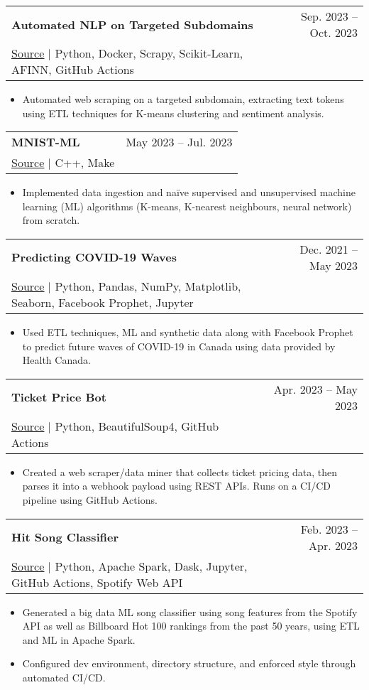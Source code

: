 \documentclass[letterpaper,11pt]{article}
\makeatletter
\newcommand{\resumeItem}[1]{
  \item\small{
    {#1 \vspace{-2pt}}
  }
}
\newcommand{\resumeProjectHeading}[4]{ %
    \item
    \begin{tabular*}{0.97\textwidth}{l@{\extracolsep{\fill}}r}
      \small\textbf{#1} & #2 \\
    \small\href{#3}{{\footnotesize\faGithub} \underline{Source}} $|$ #4 & \\ %
    \end{tabular*}\vspace{-7pt}
}
\newcommand{\resumeItemListStart}{\begin{itemize}}
\newcommand{\resumeItemListEnd}{\end{itemize}\vspace{-5pt}}
\makeatother
\begin{document}
      \resumeProjectHeading
          {Automated NLP on Targeted Subdomains}
          {Sep. 2023 -- Oct. 2023}
          {https://github.com/john-s-lin/nonsense-sentiment-scraper} %
          {Python, Docker, Scrapy, Scikit-Learn, AFINN, GitHub Actions} %
          \resumeItemListStart
            \resumeItem{Automated web scraping on a targeted subdomain, extracting text tokens using ETL techniques for K-means clustering and sentiment analysis.}
          \resumeItemListEnd

      \resumeProjectHeading
          {MNIST-ML}
          {May 2023 -- Jul. 2023}
          {https://github.com/john-s-lin/mnist-ml} %
          {C++, Make} %
          \resumeItemListStart
            \resumeItem{Implemented data ingestion and naïve supervised and unsupervised machine learning (ML) algorithms (K-means, K-nearest neighbours, neural network) from scratch.}
          \resumeItemListEnd

      \resumeProjectHeading
          {Predicting COVID-19 Waves}
          {Dec. 2021 -- May 2023}
          {https://github.com/john-s-lin/can-covid-wave} %
          {Python, Pandas, NumPy, Matplotlib, Seaborn, Facebook Prophet, Jupyter} %
          \resumeItemListStart
            \resumeItem{Used ETL techniques, ML and synthetic data along with Facebook Prophet to predict future waves of COVID-19 in Canada using data provided by Health Canada.}
          \resumeItemListEnd

      \resumeProjectHeading
          {Ticket Price Bot}
          {Apr. 2023 -- May 2023}
          {https://github.com/john-s-lin/ticket-price-bot} %
          {Python, BeautifulSoup4, GitHub Actions} %
          \resumeItemListStart
            \resumeItem{Created a web scraper/data miner that collects ticket pricing data, then parses it into a webhook payload using REST APIs. Runs on a CI/CD pipeline using GitHub Actions.}
          \resumeItemListEnd

      \resumeProjectHeading
          {Hit Song Classifier}
          {Feb. 2023 -- Apr. 2023}
          {https://github.com/john-s-lin/hit-song-classifier} %
          {Python, Apache Spark, Dask, Jupyter, GitHub Actions, Spotify Web API} %
          \resumeItemListStart
            \resumeItem{Generated a big data ML song classifier using song features from the Spotify API as well as Billboard Hot 100 rankings from the past 50 years, using ETL and ML in Apache Spark.}
            \resumeItem{Configured dev environment, directory structure, and enforced style through automated CI/CD.}
          \resumeItemListEnd
\end{document}
